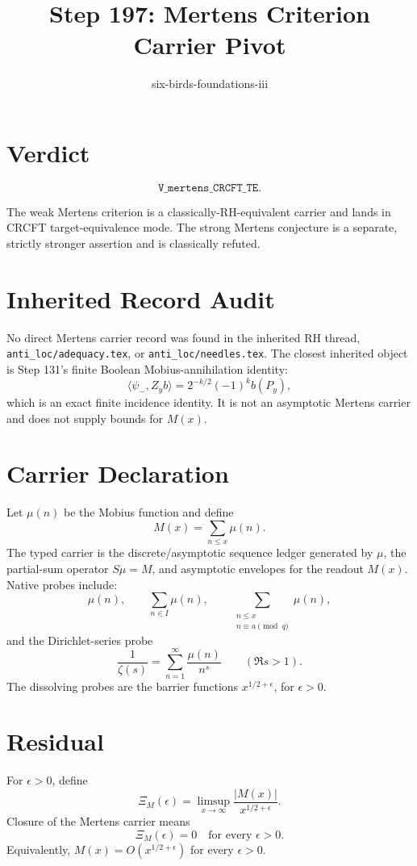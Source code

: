 \documentclass[11pt]{article}
\title{Step 197: Mertens Criterion Carrier Pivot}
\author{six-birds-foundations-iii}
\date{}
\begin{document}
\maketitle

\section*{Verdict}

\[
\boxed{\texttt{V\_mertens\_CRCFT\_TE}.}
\]

The weak Mertens criterion is a classically-RH-equivalent carrier and lands in
CRCFT target-equivalence mode.  The strong Mertens conjecture is a separate,
strictly stronger assertion and is classically refuted.

\section*{Inherited Record Audit}

No direct Mertens carrier record was found in the inherited RH thread,
\texttt{anti\_loc/adequacy.tex}, or \texttt{anti\_loc/needles.tex}.  The closest
inherited object is Step 131's finite Boolean Mobius-annihilation identity:
\[
  \langle\psi_-,Z_yb\rangle=2^{-k/2}(-1)^k b(P_y),
\]
which is an exact finite incidence identity.  It is not an asymptotic Mertens
carrier and does not supply bounds for \(M(x)\).

\section*{Carrier Declaration}

Let \(\mu(n)\) be the Mobius function and define
\[
  M(x)=\sum_{n\le x}\mu(n).
\]
The typed carrier is the discrete/asymptotic sequence ledger generated by
\(\mu\), the partial-sum operator \(S\mu=M\), and asymptotic envelopes for the
readout \(M(x)\).  Native probes include:
\[
  \mu(n),\qquad
  \sum_{n\in I}\mu(n),\qquad
  \sum_{\substack{n\le x\\ n\equiv a\pmod q}}\mu(n),
\]
and the Dirichlet-series probe
\[
  \frac1{\zeta(s)}=\sum_{n=1}^{\infty}\frac{\mu(n)}{n^s}
  \qquad(\Re s>1).
\]
The dissolving probes are the barrier functions \(x^{1/2+\epsilon}\), for
\(\epsilon>0\).

\section*{Residual}

For \(\epsilon>0\), define
\[
  \Xi_M(\epsilon)=
  \limsup_{x\to\infty}\frac{|M(x)|}{x^{1/2+\epsilon}}.
\]
Closure of the Mertens carrier means
\[
  \Xi_M(\epsilon)=0\quad\text{for every }\epsilon>0.
\]
Equivalently, \(M(x)=O(x^{1/2+\epsilon})\) for every \(\epsilon>0\).
\end{document}
